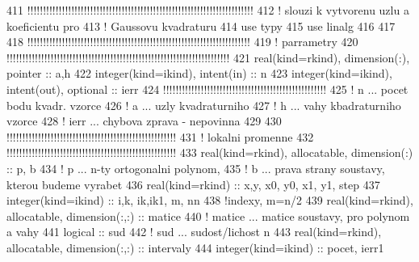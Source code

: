 \begin{DoxyCode}
411     \textcolor{comment}{!!!!!!!!!!!!!!!!!!!!!!!!!!!!!!!!!!!!!!!!!!!!!!!!!!!!!!!!!!!!!!!!!!!!!!!!
}
412     \textcolor{comment}{!  slouzi k vytvorenu uzlu a koeficientu  pro 
}
413     \textcolor{comment}{!  Gaussovu kvadraturu
}
414       \textcolor{keywordtype}{use }typy
415       \textcolor{keywordtype}{use }linalg
416 
417 
418       \textcolor{comment}{!!!!!!!!!!!!!!!!!!!!!!!!!!!!!!!!!!!!!!!!!!!!!!!!!!!!!!!!!!!!!!!!!!!!!!!
}
419       \textcolor{comment}{! parrametry
}
420       \textcolor{comment}{!!!!!!!!!!!!!!!!!!!!!!!!!!!!!!!!!!!!!!!!!!!!!!!!!!!!!!!!!!!!!!!!!!!!!!!
}
421       \textcolor{keywordtype}{real(kind=rkind)}, \textcolor{keywordtype}{dimension(:)}, \textcolor{keywordtype}{pointer} :: a,h
422       \textcolor{keywordtype}{integer(kind=ikind)}, \textcolor{keywordtype}{intent(in)} :: n 
423       \textcolor{keywordtype}{integer(kind=ikind)}, \textcolor{keywordtype}{intent(out)}, \textcolor{keywordtype}{optional} :: ierr 
424       \textcolor{comment}{!!!!!!!!!!!!!!!!!!!!!!!!!!!!!!!!!!!!!!!!!!!!!!!!!!!!
}
425       \textcolor{comment}{!    n ... pocet bodu kvadr. vzorce
}
426       \textcolor{comment}{!    a ... uzly kvadraturniho
}
427       \textcolor{comment}{!    h ... vahy kbadraturniho vzorce
}
428       \textcolor{comment}{! ierr ... chybova zprava - nepovinna
}
429 
430       \textcolor{comment}{!!!!!!!!!!!!!!!!!!!!!!!!!!!!!!!!!!!!!!!!!!!!!!!!!!!!!!
}
431       \textcolor{comment}{! lokalni promenne
}
432       \textcolor{comment}{!!!!!!!!!!!!!!!!!!!!!!!!!!!!!!!!!!!!!!!!!!!!!!!!!!!!!!
}
433       \textcolor{keywordtype}{real(kind=rkind)}, \textcolor{keywordtype}{allocatable}, \textcolor{keywordtype}{dimension(:)} ::  p, b 
434       \textcolor{comment}{! p ... n-ty ortogonalni polynom,
}
435       \textcolor{comment}{! b ... prava strany soustavy, kterou budeme vyrabet
}
436       \textcolor{keywordtype}{real(kind=rkind)} :: x,y, x0, y0, x1, y1, step
437       \textcolor{keywordtype}{integer(kind=ikind)} :: i,k, ik,ik1, m, nn
438       \textcolor{comment}{!indexy, m=n/2
}
439       \textcolor{keywordtype}{real(kind=rkind)}, \textcolor{keywordtype}{allocatable}, \textcolor{keywordtype}{dimension(:,:)} :: matice
440       \textcolor{comment}{! matice ... matice soustavy, pro polynom a vahy
}
441       \textcolor{keywordtype}{logical} :: sud
442       \textcolor{comment}{! sud ... sudost/lichost n
}
443       \textcolor{keywordtype}{real(kind=rkind)}, \textcolor{keywordtype}{allocatable}, \textcolor{keywordtype}{dimension(:,:)} :: intervaly
444       \textcolor{keywordtype}{integer(kind=ikind)} :: pocet, ierr1

\end{DoxyCode}
